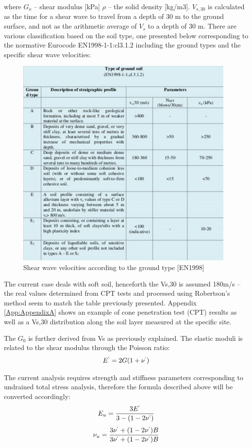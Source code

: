 \documentclass[12pt,a4paper]{report}
\begin{document}
where
$G_o$ – shear modulus [kPa]
$\rho$ – the solid density [kg/m3]. 
$V_{s,30}$ is calculated as the time for a shear wave to travel from a depth of 30 m to the ground surface, and not as the arithmetic average of $V_s$ to a depth of 30 m. There are various classification based on the soil type, one presented below corresponding to the normative Eurocode EN1998-1-1:cl3.1.2 including the ground types and the specific shear wave velocities:  
\begin{figure}[h!]
	\centering
	\includegraphics[width=0.7\linewidth]{"EC8"}
	\caption{Shear wave velocities according to the ground type [EN1998]}
	\label{EC8}
\end{figure}

The current case deals with soft soil, henceforth the Vs,30 is assumed 180m/s –the real values determined from CPT tests and processed using Robertson’s method seem to match the table previously presented. Appendix \ref{App:AppendixA} shows an example of cone penetration test (CPT) results as well as a Vs,30 distribution along the soil layer measured at the specific site. 

The $G_0$ is further derived from Vs as previously explained. The elastic moduli is related to the shear modulus through the Poisson ratio:
\begin{equation}
	E^`=2G(1+\nu^`)
\end{equation}

The current analysis requires strength and stiffness parameters corresponding to undrained total stress analysis, therefore the formula described above will be converted accordingly: 
\begin{equation}
	E_u=\frac{3E^`}{3-(1-2\nu^`)}
\end{equation}
\begin{equation}
	\nu_u=\frac{3\nu^`+(1-2\nu^`)B}{3\nu^`+(1-2\nu^`)B}
\end{equation}
	
\end{document}
